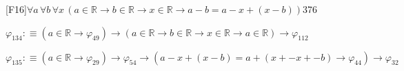 \begin{fullproof}{[F16]}{$\forall a\,\forall b\,\forall x\,(a \in \mathbb{R} \to b \in \mathbb{R} \to x \in \mathbb{R} \to a - b = a - x + (x - b))$}{376}
\begin{abbrevlist}
\item $\varphi_{134} :\equiv (a \in \mathbb{R} \to \varphi_{49}) \to (a \in \mathbb{R} \to b \in \mathbb{R} \to x \in \mathbb{R} \to a \in \mathbb{R}) \to \varphi_{112}$
\item $\varphi_{135} :\equiv (a \in \mathbb{R} \to \varphi_{29}) \to \varphi_{54} \to (a - x + (x - b) = a + (x + -x + -b) \to \varphi_{44}) \to \varphi_{32}$
\end{abbrevlist}
\end{fullproof}
